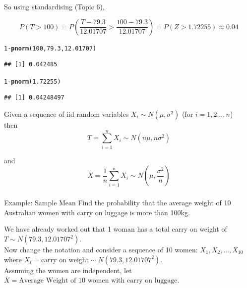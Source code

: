 \documentclass[t,xcolor=pdftex,dvipsnames,table]{beamer}\usepackage[]{graphicx}\usepackage[]{color}
\makeatletter
\newcommand{\hlnum}[1]{\textcolor[rgb]{0.686,0.059,0.569}{#1}}%
\newcommand{\hlopt}[1]{\textcolor[rgb]{0,0,0}{#1}}%
\newcommand{\hlstd}[1]{\textcolor[rgb]{0.345,0.345,0.345}{#1}}%
\newcommand{\hlkwd}[1]{\textcolor[rgb]{0.737,0.353,0.396}{\textbf{#1}}}%
\newenvironment{kframe}{%
 \def\at@end@of@kframe{}%
 \ifinner\ifhmode%
  \def\at@end@of@kframe{\end{minipage}}%
  \begin{minipage}{\columnwidth}%
 \fi\fi%
 \def\FrameCommand##1{\hskip\@totalleftmargin \hskip-\fboxsep
 \colorbox{shadecolor}{##1}\hskip-\fboxsep
     \hskip-\linewidth \hskip-\@totalleftmargin \hskip\columnwidth}%
 \MakeFramed {\advance\hsize-\width
   \@totalleftmargin\z@ \linewidth\hsize
   \@setminipage}}%
 {\par\unskip\endMakeFramed%
 \at@end@of@kframe}
\newenvironment{knitrout}{}{} %
\makeatother
\begin{document}
\begin{frame}[fragile]\frametitle{}

So using standardising (Topic 6),

\[ P(T > 100) = P(\frac{T-79.3}{12.01707} > \frac{100-79.3}{12.01707}) = P(Z > 1.72255) \approx 0.04 \]

\begin{knitrout}
\color{fgcolor}\begin{kframe}
\begin{alltt}
\hlnum{1}\hlopt{-}\hlkwd{pnorm}\hlstd{(}\hlnum{100}\hlstd{,}\hlnum{79.3}\hlstd{,}\hlnum{12.01707}\hlstd{)}
\end{alltt}
\begin{verbatim}
## [1] 0.042485
\end{verbatim}
\begin{alltt}
\hlnum{1}\hlopt{-}\hlkwd{pnorm}\hlstd{(}\hlnum{1.72255}\hlstd{)}
\end{alltt}
\begin{verbatim}
## [1] 0.04248497
\end{verbatim}
\end{kframe}
\end{knitrout}
\end{frame}


\begin{frame}{}
\begin{definition}
Given a sequence of iid random variables $X_{i} \sim N(\mu, \sigma^2)$
(for $i=1,2\ldots,n$) \\

then  \[  \boxed{ T = \sum_{i=1}^{n} X_{i}  \sim N( n \mu , n \sigma^2  ) } \]

and
\[  \boxed{ \bar{X} = \frac{1}{n} \sum_{i=1}^{n} X_{i}  \sim N( \mu, \frac{\sigma^2}{n} ) } \]

\end{definition}
\end{frame}


\begin{frame}[fragile]\frametitle{}

\begin{block}{Example: Sample Mean}
Find the probability that the average weight of 10 Australian women with carry on luggage is more than 100kg.
\end{block}

\vspace{.5cm}
We have already worked out that 1 woman has a total carry on weight of $T \sim N(79.3, 12.01707^2)$. \\

\vspace{.5cm}
Now change the notation and consider a sequence of 10 women: $X_{1}, X_{2}, \ldots, X_{10}$ where $X_{i} = \mbox{carry on weight} \sim N(79.3, 12.01707^2)$. \\

\vspace{.5cm}
Assuming the women are independent, let $\bar{X} = \mbox{Average Weight of 10 women with carry on luggage}$. \\

\end{frame}
\end{document}
